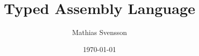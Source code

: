 \usepackage{lmodern}
\usepackage{amsmath,amssymb}     %
\usepackage{semantic}
\usepackage{ulem}
\usepackage{tikz}
\usetikzlibrary{shapes,backgrounds}

\mathlig{|->}{\mapsto}
\mathlig{~~>}{\rightsquigarrow}
\mathlig{[[}{\llbracket}
\mathlig{]]}{\rrbracket}
\mathlig{<}{\langle}
\mathlig{>}{\rangle}
\mathlig{/=>}{\not\Rightarrow}
\mathlig{*=}{\mathrel{\odot}=}
\mathlig{++}{\mdoubleplus}

\newcommand\doubleplus{+\kern-1.3ex+\kern0.8ex}
\newcommand\mdoubleplus{\ensuremath{\mathbin{+\mkern-1mu+}}}

\title{Typed Assembly Language}
\author{Mathias Svensson}
\date{\today}

